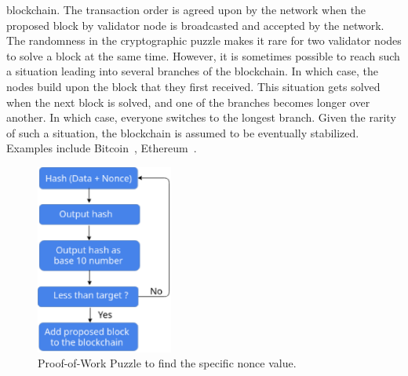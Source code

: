 blockchain. The transaction order is agreed upon by the network when the
proposed block by validator node is broadcasted and accepted by the network.
The randomness in the cryptographic puzzle makes it rare for two validator
nodes to solve a block at the same time.  However, it is sometimes possible to
reach such a situation leading into several branches of the blockchain. In
which case, the nodes build upon the block that they first received. This
situation gets solved when the next block is solved, and one of the branches
becomes longer over another. In which case, everyone switches to the longest
branch. Given the rarity of such a situation, the blockchain is assumed to be
eventually stabilized. Examples include Bitcoin~\cite{Bitcoin_Satoshi},
Ethereum~\cite{buterin2013ethereum}. 
\begin{figure}
	\begin{center}
	\includegraphics[width=0.4\textwidth]{Images/cryptographicpuzzle.eps}
	\caption{Proof-of-Work Puzzle to find the specific nonce value.}
	\label{fig:cryptographicPuzzle}
	\end{center}
\end{figure}

